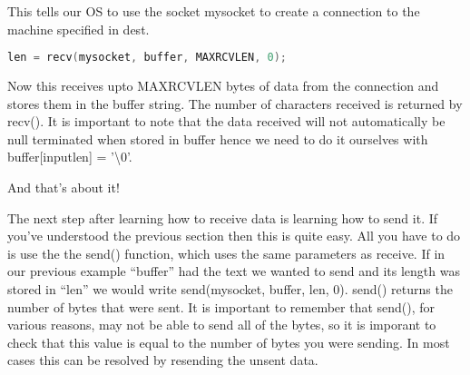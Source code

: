 This tells our OS to use the socket mysocket to create a connection to the
machine specified in dest.
\lstset{basicstyle=\scriptsize, numbers=left, captionpos=b, tabsize=4}
\begin{lstlisting}[caption=Section \thesection listing \arabic{netcnt},language={C},
breaklines=true,xleftmargin=15pt,label=lst:section\thesection listing\arabic{netcnt}]
len = recv(mysocket, buffer, MAXRCVLEN, 0);
\end{lstlisting}

Now this receives upto MAXRCVLEN bytes of data from the connection and stores
them in the buffer string. The number of characters received is returned by
recv(). It is important to note that the data received will not automatically
be null terminated when stored in buffer hence we need to do it ourselves with
buffer[inputlen] = '\textbackslash{}0'.

And that's about it!

The next step after learning how to receive data is learning how to send it. If
you've understood the previous section then this is quite easy. All you have to
do is use the the send() function, which uses the same parameters as receive.
If in our previous example ``buffer'' had the text we wanted to send and its
length was stored in ``len'' we would write send(mysocket, buffer, len, 0).
send() returns the number of bytes that were sent. It is important to remember
that send(), for various reasons, may not be able to send all of the bytes, so
it is imporant to check that this value is equal to the number of bytes you
were sending. In most cases this can be resolved by resending the unsent data.

